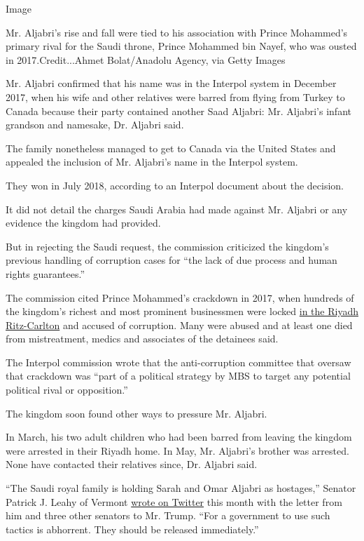 Image

Mr. Aljabri's rise and fall were tied to his association with Prince
Mohammed's primary rival for the Saudi throne, Prince Mohammed bin
Nayef, who was ousted in 2017.Credit...Ahmet Bolat/Anadolu Agency, via
Getty Images

Mr. Aljabri confirmed that his name was in the Interpol system in
December 2017, when his wife and other relatives were barred from flying
from Turkey to Canada because their party contained another Saad
Aljabri: Mr. Aljabri's infant grandson and namesake, Dr. Aljabri said.

The family nonetheless managed to get to Canada via the United States
and appealed the inclusion of Mr. Aljabri's name in the Interpol system.

They won in July 2018, according to an Interpol document about the
decision.

It did not detail the charges Saudi Arabia had made against Mr. Aljabri
or any evidence the kingdom had provided.

But in rejecting the Saudi request, the commission criticized the
kingdom's previous handling of corruption cases for ``the lack of due
process and human rights guarantees.''

The commission cited Prince Mohammed's crackdown in 2017, when hundreds
of the kingdom's richest and most prominent businessmen were locked
\href{https://www.nytimes.com/2018/03/11/world/middleeast/saudi-arabia-corruption-mohammed-bin-salman.html}{in
the Riyadh Ritz-Carlton} and accused of corruption. Many were abused and
at least one died from mistreatment, medics and associates of the
detainees said.

The Interpol commission wrote that the anti-corruption committee that
oversaw that crackdown was ``part of a political strategy by MBS to
target any potential political rival or opposition.''

The kingdom soon found other ways to pressure Mr. Aljabri.

In March, his two adult children who had been barred from leaving the
kingdom were arrested in their Riyadh home. In May, Mr. Aljabri's
brother was arrested. None have contacted their relatives since, Dr.
Aljabri said.

``The Saudi royal family is holding Sarah and Omar Aljabri as
hostages,'' Senator Patrick J. Leahy of Vermont
\href{https://twitter.com/SenatorLeahy/status/1281281725499408386}{wrote
on Twitter} this month with the letter from him and three other senators
to Mr. Trump. ``For a government to use such tactics is abhorrent. They
should be released immediately.''

